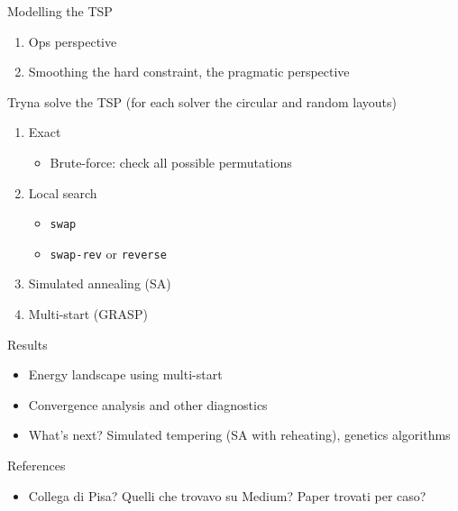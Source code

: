 \documentclass[10pt,a4paper,fleqn]{article}
\theoremstyle{definition}
\newcommand{\inToc}[1]%
	{\addcontentsline{toc}{section}{\texorpdfstring{\protect\numberline{}#1}{#1}}}
\begin{document}
\noindent
Modelling the TSP
\begin{enumerate}
	\item Ops perspective
	\item Smoothing the hard constraint, the pragmatic perspective
\end{enumerate}
Tryna solve the TSP (for each solver the circular and random layouts)
\begin{enumerate}
	\item Exact
	\begin{itemize}
		\item Brute-force: check all possible permutations
	\end{itemize}
	\item Local search
	\begin{itemize}
		\item \texttt{swap}
		\item \texttt{swap-rev} or \texttt{reverse}
	\end{itemize}
	\item Simulated annealing (SA)
	\item Multi-start (GRASP)
\end{enumerate}
Results
\begin{itemize}
	\item Energy landscape using multi-start
	\item Convergence analysis and other diagnostics
	\item What's next? Simulated tempering (SA with reheating), genetics algorithms
\end{itemize}
References
\begin{itemize}
	\item Collega di Pisa? Quelli che trovavo su Medium? Paper trovati per caso?
\end{itemize}
\cleardoublepage




\end{document}
